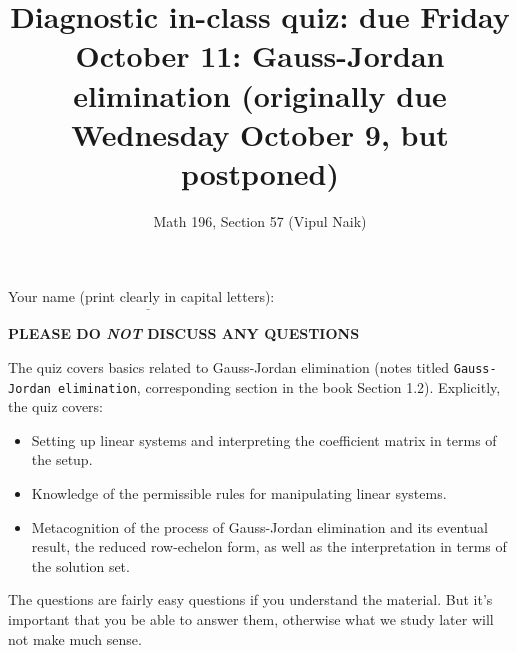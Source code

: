 \documentclass[10pt]{amsart}
\title{Diagnostic in-class quiz: due Friday October 11: Gauss-Jordan elimination (originally due Wednesday October 9, but postponed)}
\author{Math 196, Section 57 (Vipul Naik)}
\begin{document}
\maketitle

Your name (print clearly in capital letters): $\underline{\qquad\qquad\qquad\qquad\qquad\qquad\qquad\qquad\qquad\qquad}$

{\bf PLEASE DO {\em NOT} DISCUSS ANY QUESTIONS}

The quiz covers basics related to Gauss-Jordan elimination (notes
titled {\tt Gauss-Jordan elimination}, corresponding section in the
book Section 1.2). Explicitly, the quiz covers:

\begin{itemize}
\item Setting up linear systems and interpreting the coefficient
  matrix in terms of the setup.
\item Knowledge of the permissible rules for manipulating linear
  systems.
\item Metacognition of the process of Gauss-Jordan elimination and its
  eventual result, the reduced row-echelon form, as well as the
  interpretation in terms of the solution set.
\end{itemize}

The questions are fairly easy questions if you understand the
material. But it's important that you be able to answer them,
otherwise what we study later will not make much sense.
\end{document}
